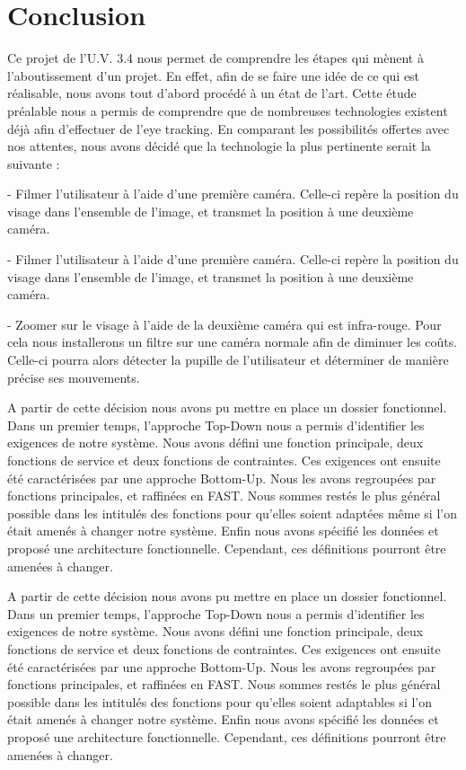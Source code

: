 \section*{Conclusion}


Ce projet de l'U.V. 3.4 nous permet de comprendre les étapes qui mènent à l'aboutissement d'un projet. En effet, afin de se faire une idée de ce qui est réalisable, nous avons tout d'abord procédé à un état de l'art. Cette étude préalable nous a permis de comprendre que de nombreuses technologies existent déjà afin d'effectuer de l'eye tracking. En comparant les possibilités offertes avec nos attentes, nous avons décidé que la technologie la plus pertinente serait la suivante :

- Filmer l'utilisateur à l'aide d'une première caméra. Celle-ci repère la position du visage dans l'ensemble de l'image, et transmet la position à une deuxième caméra.

- Filmer l'utilisateur à l'aide d'une première caméra. Celle-ci repère la position du visage dans l'ensemble de l'image, et transmet la position à une deuxième caméra.

- Zoomer sur le visage à l'aide de la deuxième caméra qui est infra-rouge. Pour cela nous installerons  un filtre sur une caméra normale afin de diminuer les coûts. Celle-ci pourra alors détecter la pupille de l'utilisateur et déterminer de manière précise ses mouvements.

\vspace*{1cm}

A partir de cette décision nous avons pu mettre en place un dossier fonctionnel. Dans un premier temps, l'approche Top-Down nous a permis d'identifier les exigences de notre système. Nous avons défini une fonction  principale, deux fonctions de service et deux fonctions de contraintes. Ces exigences ont ensuite été caractérisées par une approche Bottom-Up. Nous les avons regroupées par fonctions principales, et raffinées en FAST. Nous sommes restés le plus général possible dans les intitulés des fonctions pour qu'elles soient adaptées même si l'on était amenés à changer notre système. Enfin nous avons spécifié les données et proposé une architecture fonctionnelle. Cependant, ces définitions pourront être amenées à changer.

A partir de cette décision nous avons pu mettre en place un dossier fonctionnel. Dans un premier temps, l'approche Top-Down nous a permis d'identifier les exigences de notre système. Nous avons défini une fonction  principale, deux fonctions de service et deux fonctions de contraintes. Ces exigences ont ensuite été caractérisées par une approche Bottom-Up. Nous les avons regroupées par fonctions principales, et raffinées en FAST. Nous sommes restés le plus général possible dans les intitulés des fonctions pour qu'elles soient adaptables si l'on était amenés à changer notre système. Enfin nous avons spécifié les données et proposé une architecture fonctionnelle. Cependant, ces définitions pourront être amenées à changer.

